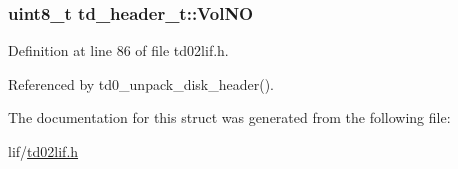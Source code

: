 \subsubsection[{\texorpdfstring{Vol\+NO}{VolNO}}]{\setlength{\rightskip}{0pt plus 5cm}uint8\+\_\+t td\+\_\+header\+\_\+t\+::\+Vol\+NO}\hypertarget{structtd__header__t_a081c4518281071d65fe82f6c8260b1f5}{}\label{structtd__header__t_a081c4518281071d65fe82f6c8260b1f5}


Definition at line 86 of file td02lif.\+h.



Referenced by td0\+\_\+unpack\+\_\+disk\+\_\+header().



The documentation for this struct was generated from the following file\+:\begin{DoxyCompactItemize}
\item 
lif/\hyperlink{td02lif_8h}{td02lif.\+h}\end{DoxyCompactItemize}
